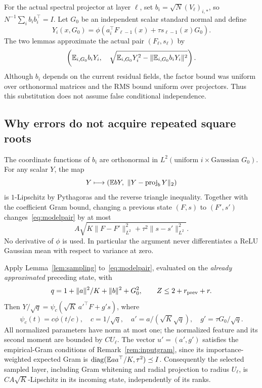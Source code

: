 For the actual spectral projector at layer $\ell$, set
$b_i=\sqrt N(V_\ell)_{i,*}$, so $N^{-1}\sum_i b_ib_i^\top=I$.
Let $G_0$ be an independent scalar standard normal and define
\[
 Y_i(x,G_0)=\phi(a_i^\top F_{\ell-1}(x)+\tau s_{\ell-1}(x)G_0).
\]
The two lemmas approximate the actual pair $(F_\ell,s_\ell)$ by
\begin{equation}
 \left(\mathbb E_{i,G_0}b_iY_i,\quad
       \sqrt{\mathbb E_{i,G_0}Y_i^2-\|\mathbb E_{i,G_0}b_iY_i\|^2}\right).
 \label{eq:modelpair}
\end{equation}
Although $b_i$ depends on the current residual fields, the factor bound was uniform over orthonormal matrices and the RMS bound uniform over projectors. Thus this substitution does not assume false conditional independence.

\subsection{Why errors do not acquire repeated square roots}
The coordinate functions of $b_i$ are orthonormal in
$L^2(\text{uniform }i\times\text{Gaussian }G_0)$. For any scalar $Y$, the map
\[
 Y\longmapsto\left(\E bY,\ \|Y-\operatorname{proj}_bY\|_2\right)
\]
is $1$-Lipschitz by Pythagoras and the reverse triangle inequality.
Together with the coefficient Gram bound, changing a previous state $(F,s)$ to $(F',s')$ changes~\eqref{eq:modelpair} by at most
\begin{equation}
 A\sqrt{K\|F-F'\|_{L^2}^2+\tau^2\|s-s'\|_{L^2}^2}.
 \label{eq:propagation}
\end{equation}
No derivative of $\phi$ is used. In particular the argument never differentiates a ReLU Gaussian mean with respect to variance at zero.

Apply Lemma~\ref{lem:sampling} to~\eqref{eq:modelpair}, evaluated on the \emph{already approximated} preceding state, with
\[
 q=1+\|a\|^2/K+\|b\|^2+G_0^2,\qquad
 Z\le2+r_{\rm prev}+r.
\]
Then $Y/\sqrt q=\psi_c(\sqrt K\,a'^\top F+g's)$, where
\[
 \psi_c(t)=c\phi(t/c),\quad c=1/\sqrt q,\quad
 a'=a/(\sqrt K\sqrt q),\quad g'=\tau G_0/\sqrt q .
\]
All normalized parameters have norm at most one; the normalized feature and its second moment are bounded by $C U_\ell$. The vector
$u'=(a',g')$ satisfies the empirical-Gram conditions of Remark~\ref{rem:inputgram}, since its importance-weighted expected Gram is
$\operatorname{diag}(\mathbb E aa^\top/K,\tau^2)\preceq I$.
Consequently the selected sampled layer, including Gram whitening and radial projection to radius $U_\ell$, is $C A\sqrt K$-Lipschitz in its incoming state, independently of its ranks.


